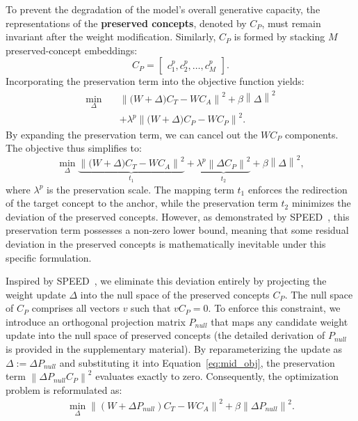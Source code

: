 \documentclass[letterpaper]{article} %
\begin{document}
To prevent the degradation of the model's overall generative capacity, the representations of the \textbf{preserved concepts}, denoted by $C_P$, must remain invariant after the weight modification. Similarly, $C_P$ is formed by stacking $M$ preserved-concept embeddings:
\begin{equation}
    C_P = \begin{bmatrix} c^{p}_1, c^{p}_2, \dots, c^{p}_M \end{bmatrix} .
\end{equation}
Incorporating the preservation term into the objective function yields:
\begin{equation}
\begin{aligned}
\min_{\Delta}\quad
& \left\|\bigl(W+\Delta\bigr)C_T-WC_A\right\|^2 + \beta\left\|\Delta\right\|^2\\
& + \lambda^{p}
  \left\|\bigl(W+\Delta\bigr)C_P-WC_P\right\|^2 . 
\end{aligned}
\end{equation}
By expanding the preservation term, we can cancel out the $WC_P$ components. The objective thus simplifies to:
\begin{equation}\label{eq:mid_obj}
    \min_{\Delta} 
    \underbrace{\left\|\big(W+\Delta\big)C_{T}-WC_{A}\right\|^2}_{t_{1}} 
    + 
    \underbrace{\lambda^{p}\left\|\Delta C_{P}\right\|^2}_{t_2} 
    + 
    \beta\left\|\Delta\right\|^2 ,
\end{equation}
where $\lambda^{p}$ is the preservation scale. The mapping term $t_1$ enforces the redirection of the target concept to the anchor, while the preservation term $t_2$ minimizes the deviation of the preserved concepts. However, as demonstrated by SPEED~\cite{SPEED}, this preservation term possesses a non-zero lower bound, meaning that some residual deviation in the preserved concepts is mathematically inevitable under this specific formulation.

Inspired by SPEED~\cite{SPEED}, we eliminate this deviation entirely by projecting the weight update $\Delta$ into the null space of the preserved concepts $C_P$. The null space of $C_P$ comprises all vectors $v$ such that $v C_P = 0$. To enforce this constraint, we introduce an orthogonal projection matrix $P_{null}$ that maps any candidate weight update into the null space of preserved concepts (the detailed derivation of $P_{null}$ is provided in the supplementary material). By reparameterizing the update as $\Delta := \Delta P_{null}$ and substituting it into Equation~\eqref{eq:mid_obj}, the preservation term $\left\|\Delta P_{null} C_P\right\|^2$ evaluates exactly to zero. Consequently, the optimization problem is reformulated as:
\begin{equation}\label{equa:final}
\begin{aligned}
    \min_{\Delta}\left\| (W + \Delta P_{null}) C_{T} - W C_{A} \right\|^2 + \beta \left\| \Delta P_{null} \right\|^2 .
\end{aligned}
\end{equation}
\end{document}
